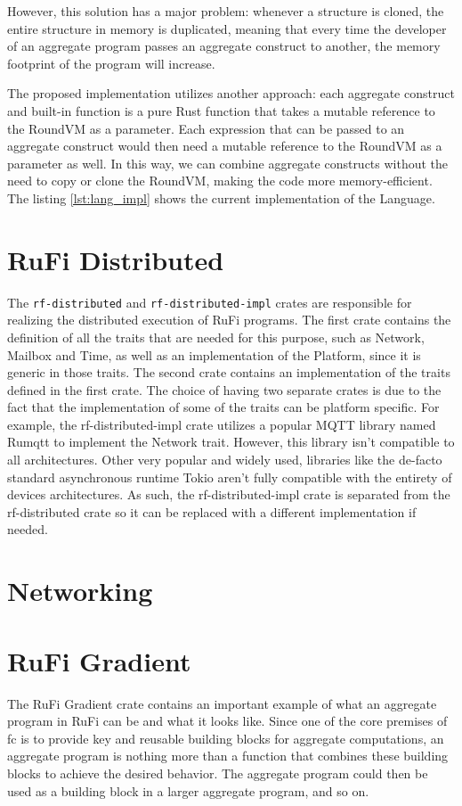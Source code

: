However, this solution has a major problem: whenever a structure is cloned, the entire structure in memory is duplicated, meaning that every time the developer of an aggregate program
passes an aggregate construct to another, the memory footprint of the program will increase.

The proposed implementation utilizes another approach: each aggregate construct and built-in function is a pure Rust function that takes a mutable reference to the RoundVM as a parameter.
Each expression that can be passed to an aggregate construct would then need a mutable reference to the RoundVM as a parameter as well. In this way, we can combine aggregate constructs
without the need to copy or clone the RoundVM, making the code more memory-efficient. The listing \ref{lst:lang_impl} shows the current implementation of the Language.



\section{RuFi Distributed}
The \texttt{rf-distributed} and \texttt{rf-distributed-impl} crates are responsible for realizing the distributed execution of RuFi programs. The first crate contains the definition of all the traits
that are needed for this purpose, such as Network, Mailbox and Time, as well as an implementation of the Platform, since it is generic in those traits. The second crate contains an implementation of the traits
defined in the first crate. The choice of having two separate crates is due to the fact that the implementation of some of the traits can be platform specific. For example, the rf-distributed-impl crate
utilizes a popular MQTT library named Rumqtt \cite{005} to implement the Network trait. However, this library isn't compatible to all architectures. Other very popular and widely used, libraries like
the de-facto standard asynchronous runtime Tokio \cite{004} aren't fully compatible with the entirety of devices architectures. As such, the rf-distributed-impl crate is separated
from the rf-distributed crate so it can be replaced with a different implementation if needed.

\section{Networking}


\section{RuFi Gradient}
The RuFi Gradient crate contains an important example of what an aggregate program in RuFi can be and what it looks like. Since one of the core premises of \ac{fc} is to
provide key and reusable building blocks for aggregate computations, an aggregate program is nothing more than a function that combines these building blocks to achieve the
desired behavior. The aggregate program could then be used as a building block in a larger aggregate program, and so on.


